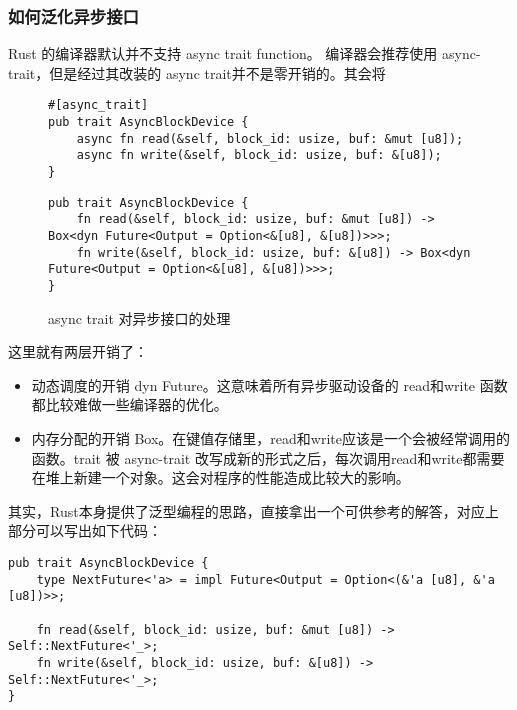 \subsubsection*{如何泛化异步接口}

Rust 的编译器默认并不支持 async trait function。 编译器会推荐使用 async-trait，但是经过其改装的 async trait并不是零开销的。其会将


\begin{figure}[htbp]
    \figureCapSet
	\centering
	\begin{minipage}{0.49\linewidth}%
		\centering
        \begin{lstlisting}[frame=none]
#[async_trait]
pub trait AsyncBlockDevice {
    async fn read(&self, block_id: usize, buf: &mut [u8]);
    async fn write(&self, block_id: usize, buf: &[u8]);
}
        \end{lstlisting}
	\end{minipage}
    \hfill
	\begin{minipage}{0.49\linewidth}
		\centering
        \begin{lstlisting}[frame=none]
pub trait AsyncBlockDevice {
    fn read(&self, block_id: usize, buf: &mut [u8]) -> Box<dyn Future<Output = Option<&[u8], &[u8])>>>;
    fn write(&self, block_id: usize, buf: &[u8]) -> Box<dyn Future<Output = Option<&[u8], &[u8])>>>;
}
        \end{lstlisting}
	\end{minipage}
    \caption{async trait 对异步接口的处理}
\end{figure}


这里就有两层开销了：

\begin{itemize}
    \item 动态调度的开销 dyn Future。这意味着所有异步驱动设备的 read和write 函数都比较难做一些编译器的优化。
    \item 内存分配的开销 Box。在键值存储里，read和write应该是一个会被经常调用的函数。trait 被 async-trait 改写成新的形式之后，每次调用read和write都需要在堆上新建一个对象。这会对程序的性能造成比较大的影响。
\end{itemize}
其实，Rust本身提供了泛型编程的思路，直接拿出一个可供参考的解答，对应上部分可以写出如下代码：


\begin{lstlisting}[caption = AsyncBlockDevice的泛型异步接口]
pub trait AsyncBlockDevice {
    type NextFuture<'a> = impl Future<Output = Option<(&'a [u8], &'a [u8])>>;

    fn read(&self, block_id: usize, buf: &mut [u8]) -> Self::NextFuture<'_>;
    fn write(&self, block_id: usize, buf: &[u8]) -> Self::NextFuture<'_>;
}
\end{lstlisting}


